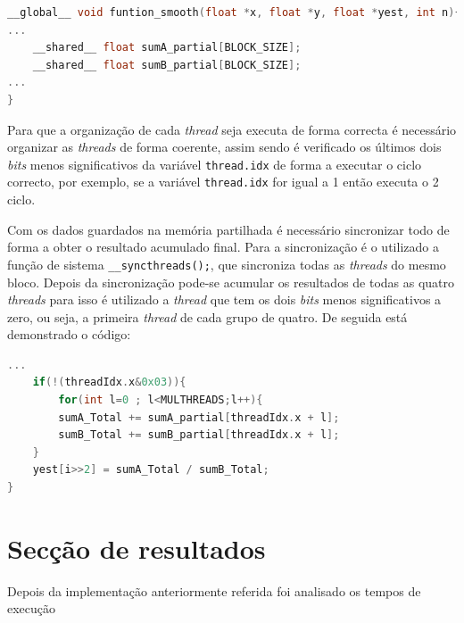 \documentclass[11pt]{article}
\numberwithin{equation}{section}
\begin{document}
\begin{lstlisting}[language=C]
__global__ void funtion_smooth(float *x, float *y, float *yest, int n){
...
	__shared__ float sumA_partial[BLOCK_SIZE];
	__shared__ float sumB_partial[BLOCK_SIZE];
...
}
\end{lstlisting}

Para que a organização de cada \textit{thread} seja executa de forma correcta é necessário organizar as \textit{threads} de forma coerente, assim sendo é verificado os últimos dois \textit{bits} menos significativos da variável \texttt{thread.idx} de forma a executar o ciclo correcto, por exemplo, se a variável \texttt{thread.idx} for igual a 1 então executa o 2 ciclo.

Com os dados guardados na memória partilhada é necessário sincronizar todo de forma a obter o resultado acumulado final. Para a sincronização é o utilizado a função de sistema \texttt{\_\_syncthreads();}, que sincroniza todas as \textit{threads} do mesmo bloco.
Depois da sincronização pode-se acumular os resultados de todas as quatro \textit{threads} para isso é utilizado a \textit{thread} que tem os dois \textit{bits} menos significativos a zero, ou seja, a primeira \textit{thread} de cada grupo de quatro. De seguida está demonstrado o código:

\begin{lstlisting}[language=C]
	...
	if(!(threadIdx.x&0x03)){
		for(int l=0 ; l<MULTHREADS;l++){
		sumA_Total += sumA_partial[threadIdx.x + l];
		sumB_Total += sumB_partial[threadIdx.x + l];	
	}
	yest[i>>2] = sumA_Total / sumB_Total;
}
\end{lstlisting}


\section{Secção de resultados}
Depois da implementação anteriormente referida foi analisado os tempos de execução
\end{document}
